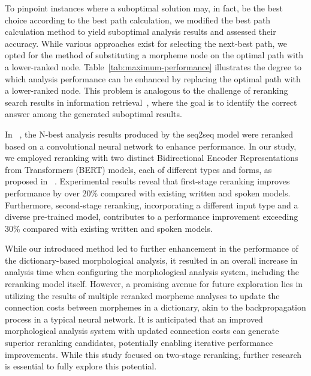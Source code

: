\documentclass[AMS,STIX2COL]{WileyNJD-v2}
\begin{document}
    To pinpoint instances where a suboptimal solution may, in fact, be the best choice according to the best path calculation, we modified the best path calculation method to yield suboptimal analysis results and assessed their accuracy.
    While various approaches exist for selecting the next-best path, we opted for the method of substituting a morpheme node on the optimal path with a lower-ranked node.
    Table~\ref{tab:maximum-performance} illustrates the degree to which analysis performance can be enhanced by replacing the optimal path with a lower-ranked node.
    This problem is analogous to the challenge of reranking search results in information retrieval~\cite{BaeYJ2021}, where the goal is to identify the correct answer among the generated suboptimal results.

    In ~\cite{ChoiYS2018}, the N-best analysis results produced by the seq2seq model were reranked based on a convolutional neural network to enhance performance.
    In our study, we employed reranking with two distinct Bidirectional Encoder Representations from Transformers (BERT) models, each of different types and forms, as proposed in ~\cite{Nogueira2019}.
    Experimental results reveal that first-stage reranking improves performance by over 20\% compared with existing written and spoken models.
    Furthermore, second-stage reranking, incorporating a different input type and a diverse pre-trained model, contributes to a performance improvement exceeding 30\% compared with existing written and spoken models.

    While our introduced method led to further enhancement in the performance of the dictionary-based morphological analysis, it resulted in an overall increase in analysis time when configuring the morphological analysis system, including the reranking model itself.
    However, a promising avenue for future exploration lies in utilizing the results of multiple reranked morpheme analyses to update the connection costs between morphemes in a dictionary, akin to the backpropagation process in a typical neural network.
    It is anticipated that an improved morphological analysis system with updated connection costs can generate superior reranking candidates, potentially enabling iterative performance improvements.
    While this study focused on two-stage reranking, further research is essential to fully explore this potential.
\end{document}
